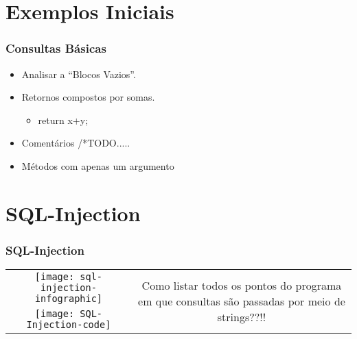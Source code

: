 \documentclass[10pt, aspectratio=169]{beamer}
\begin{document}
\section{Exemplos Iniciais}
\begin{frame}
	\frametitle{Consultas Básicas}
	  \begin{itemize}
		\item  Analisar a ``Blocos Vazios''.
		\item  Retornos compostos por somas.
		\begin{itemize}
			\item return x+y;	
		\end{itemize}
		\item Comentários /*TODO.....
		\item Métodos com apenas um argumento
		
	\end{itemize}
	
	
	
\end{frame}


\section{SQL-Injection}
\begin{frame}
	\frametitle{SQL-Injection}
	
	\begin{quotation}
	\end{quotation}
	\begin{center}
		\begin{tabular}{c c}
			\texttt{[image: sql-injection-infographic]} & \multirow{2}{4cm}{Como listar todos os pontos do programa em que consultas são passadas por meio de strings??!!}
			\\
			\texttt{[image: SQL-Injection-code]}
		\end{tabular}
		
	\end{center}
	
	
	
	
	\vfill
	\vfill
	
\end{frame}
\end{document}
